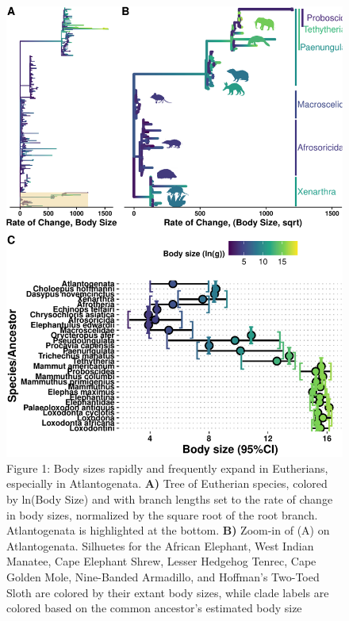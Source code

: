 \documentclass[10pt,letterpaper]{article}
\begin{document}
\begin{figure}
\centering
\includegraphics{paper_PLOS_draft_files/figure-latex/Figure 1-1.pdf}
\caption{Figure 1: Body sizes rapidly and frequently expand in
Eutherians, especially in Atlantogenata. \textbf{A)} Tree of Eutherian
species, colored by ln(Body Size) and with branch lengths set to the
rate of change in body sizes, normalized by the square root of the root
branch. Atlantogenata is highlighted at the bottom. \textbf{B)} Zoom-in
of (A) on Atlantogenata. Silhuetes for the African Elephant, West Indian
Manatee, Cape Elephant Shrew, Lesser Hedgehog Tenrec, Cape Golden Mole,
Nine-Banded Armadillo, and Hoffman's Two-Toed Sloth are colored by their
extant body sizes, while clade labels are colored based on the common
ancestor's estimated body size}
\end{figure}
\end{document}
